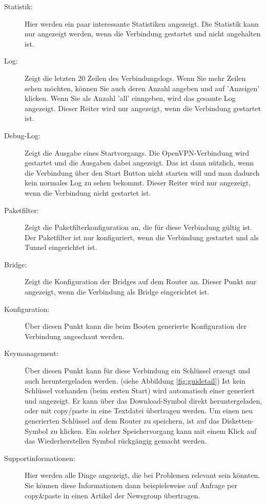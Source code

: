 \begin{description}
\item [Statistik:] Hier werden ein paar interessante Statistiken
    angezeigt.  Die Statistik kann nur angezeigt werden, wenn die
    Verbindung gestartet und nicht angehalten ist.

\item [Log:] Zeigt die letzten 20 Zeilen des Verbindungslogs.  Wenn
    Sie mehr Zeilen sehen möchten, können Sie auch deren Anzahl
    angeben und auf 'Anzeigen' klicken.  Wenn Sie als Anzahl 'all'
    einngeben, wird das gesamte Log angezeigt.  Dieser Reiter wird nur
    angezeigt, wenn die Verbindung gestartet ist.

\item [Debug-Log:] Zeigt die Ausgabe eines Startvorgangs.  Die
    OpenVPN-Verbindung wird gestartet und die Ausgaben dabei
    angezeigt.  Das ist dann nützlich, wenn die Verbindung über den
    Start Button nicht starten will und man dadurch kein normales Log
    zu sehen bekommt.  Dieser Reiter wird nur angezeigt, wenn die
    Verbindung nicht gestartet ist.

\item [Paketfilter:] Zeigt die Paketfilterkonfiguration an, die für
    diese Verbindung gültig ist. Der Paketfilter ist nur konfiguriert,
    wenn die Verbindung gestartet und als Tunnel eingerichtet ist.

\item [Bridge:] Zeigt die Konfiguration der Bridges auf dem Router
    an. Dieser Punkt nur angezeigt, wenn die Verbindung als Bridge
    eingerichtet ist.

\item [Konfiguration:] Über diesen Punkt kann die beim Booten
    generierte Konfiguration der Verbindung angeschaut werden.

\item [Keymanagement:] Über diesen Punkt kann für diese Verbindung ein
    Schlüssel erzeugt und auch heruntergeladen werden. (siehe
    Abbildung \ref{fig:guidetail}) Ist kein Schlüssel vorhanden (beim
    ersten Start) wird automatisch einer generiert und angezeigt. Er
    kann über das Download-Symbol direkt heruntergeladen, oder mit
    copy/paste in eine Textdatei übertragen werden. Um einen neu
    generierten Schlüssel auf dem Router zu speichern, ist auf das
    Disketten-Symbol zu klicken. Ein solcher Speichervorgang kann mit
    einem Klick auf das Wiederherstellen Symbol rückgängig gemacht
    werden.

\item [Supportinformationen:] Hier werden alle Dinge angezeigt, die
    bei Problemen relevant sein könnten.  Sie können diese
    Informationen dann beispielsweise auf Anfrage per copy\&paste in
    einen Artikel der Newsgroup übertragen.

\end{description}



